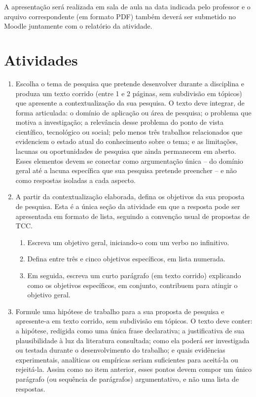 \documentclass[10pt,a4paper]{extarticle}
\newcommand{\ntc}[1]{\textcolor{notice}{#1}}
\begin{document}
A apresentação será realizada em sala de aula na data indicada pelo professor e o arquivo correspondente (em formato PDF) também deverá ser submetido no Moodle juntamente com o relatório da atividade.

\section*{Atividades}

\begin{enumerate}[label=\textbf{\arabic*.}]

\item Escolha o tema de pesquisa que pretende desenvolver durante a disciplina e produza um texto corrido (entre 1 e 2 páginas, sem subdivisão em tópicos) que apresente a contextualização da sua pesquisa. O texto deve integrar, de forma articulada: o domínio de aplicação ou área de pesquisa; o problema que motiva a investigação; a relevância desse problema do ponto de vista científico, tecnológico ou social; pelo menos três trabalhos relacionados que evidenciem o estado atual do conhecimento sobre o tema; e as limitações, lacunas ou oportunidades de pesquisa que ainda permanecem em aberto. Esses elementos devem se conectar como argumentação única -- do domínio geral até a lacuna específica que sua pesquisa pretende preencher -- e não como respostas isoladas a cada aspecto.

\item A partir da contextualização elaborada, defina os objetivos da sua proposta de pesquisa. \ntc{Esta é a única seção da atividade em que a resposta pode ser apresentada em formato de lista, seguindo a convenção usual de propostas de TCC.}

\begin{enumerate}[label=(\alph*)]
    \item Escreva um objetivo geral, iniciando-o com um verbo no infinitivo.
    \item Defina entre três e cinco objetivos específicos, em lista numerada.
    \item Em seguida, escreva um curto parágrafo (em texto corrido) explicando como os objetivos específicos, em conjunto, contribuem para atingir o objetivo geral.
\end{enumerate}

\item Formule uma hipótese de trabalho para a sua proposta de pesquisa e apresente-a em texto corrido, sem subdivisão em tópicos. O texto deve conter: a hipótese, redigida como uma única frase declarativa; a justificativa de sua plausibilidade à luz da literatura consultada; como ela poderá ser investigada ou testada durante o desenvolvimento do trabalho; e quais evidências experimentais, analíticas ou empíricas seriam suficientes para aceitá-la ou rejeitá-la. Assim como no item anterior, esses pontos devem compor um único parágrafo (ou sequência de parágrafos) argumentativo, e não uma lista de respostas.


\end{enumerate}
\end{document}
